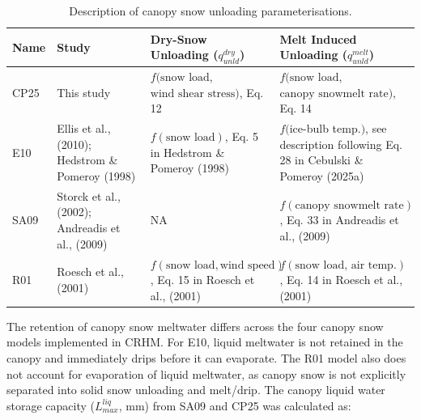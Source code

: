 \documentclass[
]{agujournal2019}
\begin{document}
\begin{longtable}[]{@{}
  >{\raggedright\arraybackslash}p{}
  >{\raggedright\arraybackslash}p{}
  >{\raggedright\arraybackslash}p{}
  >{\raggedright\arraybackslash}p{}@{}}

\caption{\label{tbl-model-desc}Description of canopy snow unloading
parameterisations.}

\tabularnewline

\toprule\noalign{}
\begin{minipage}[b]{\linewidth}\raggedright
Name
\end{minipage} & \begin{minipage}[b]{\linewidth}\raggedright
Study
\end{minipage} & \begin{minipage}[b]{\linewidth}\raggedright
Dry-Snow Unloading (\(q_{unld}^{dry}\))
\end{minipage} & \begin{minipage}[b]{\linewidth}\raggedright
Melt Induced Unloading (\(q_{unld}^{melt}\))
\end{minipage} \\
\midrule\noalign{}
\endhead
\bottomrule\noalign{}
\endlastfoot
CP25 & This study &
\(f(\text{snow load}\),\newline \(\text{wind shear stress})\), Eq. 12 &
\(f(\text{snow load}\),\newline \(\text{canopy snowmelt rate})\), Eq.
14 \\
E10 & Ellis et al., (2010); Hedstrom \& Pomeroy (1998) &
\(f(\text{snow load})\), Eq. 5 in Hedstrom \& Pomeroy (1998) &
\(f(\)ice-bulb temp.\()\), see description following Eq. 28 in Cebulski
\& Pomeroy (2025a) \\
SA09 & Storck et al., (2002); Andreadis et al., (2009) & NA &
\(f(\text{canopy snowmelt rate})\), Eq. 33 in Andreadis et al.,
(2009) \\
R01 & Roesch et al., (2001) &
\(f(\text{snow load}, \text{wind speed})\), Eq. 15 in Roesch et al.,
(2001) & \(f(\text{snow load, air temp.})\), Eq. 14 in Roesch et al.,
(2001) \\

\end{longtable}

The retention of canopy snow meltwater differs across the four canopy
snow models implemented in CRHM. For E10, liquid meltwater is not
retained in the canopy and immediately drips before it can evaporate.
The R01 model also does not account for evaporation of liquid meltwater,
as canopy snow is not explicitly separated into solid snow unloading and
melt/drip. The canopy liquid water storage capacity (\(L_{max}^{liq}\),
mm) from SA09 and CP25 was calculated as:
\end{document}
